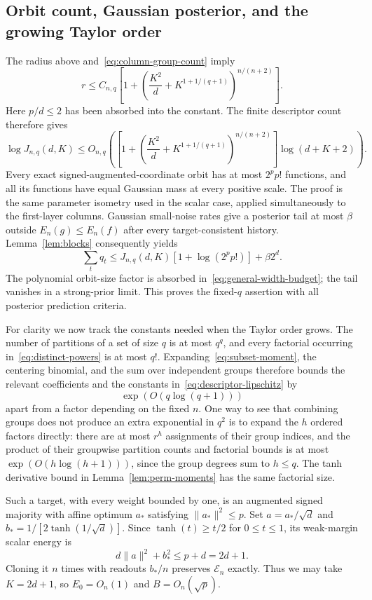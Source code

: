 \subsection{Orbit count, Gaussian posterior, and the growing Taylor order}
The radius above and~\eqref{eq:column-group-count} imply
\[
 r\le C_{n,q}\left[1+
 \left(\frac{K^2}{d}+K^{1+1/(q+1)}\right)^{n/(n+2)}\right].
\]
Here $p/d\le2$ has been absorbed into the constant. The finite descriptor count therefore gives
\[
 \log J_{n,q}(d,K)
 \le O_{n,q}\left(
 \left[1+\left(\frac{K^2}{d}+K^{1+1/(q+1)}\right)^{n/(n+2)}\right]
 \log(d+K+2)\right).
\]
Every exact signed-augmented-coordinate orbit has at most $2^pp!$ functions, and all its functions have equal Gaussian mass at every positive scale. The proof is the same parameter isometry used in the scalar case, applied simultaneously to the first-layer columns. Gaussian small-noise rates give a posterior tail at most $\beta$ outside $E_n(g)\le E_n(f)$ after every target-consistent history. Lemma~\ref{lem:blocks} consequently yields
\[
 \sum_tq_t\le J_{n,q}(d,K)[1+\log(2^pp!)]+\beta2^d.
\]
The polynomial orbit-size factor is absorbed in~\eqref{eq:general-width-budget}; the tail vanishes in a strong-prior limit. This proves the fixed-$q$ assertion with all posterior prediction criteria.

For clarity we now track the constants needed when the Taylor order grows. The number of partitions of a set of size $q$ is at most $q^q$, and every factorial occurring in~\eqref{eq:distinct-powers} is at most $q!$. Expanding~\eqref{eq:subset-moment}, the centering binomial, and the sum over independent groups therefore bounds the relevant coefficients and the constants in~\eqref{eq:descriptor-lipschitz} by
\[
 \exp(O(q\log(q+1)))
\]
apart from a factor depending on the fixed $n$. One way to see that combining groups does not produce an extra exponential in $q^2$ is to expand the $h$ ordered factors directly: there are at most $r^h$ assignments of their group indices, and the product of their groupwise partition counts and factorial bounds is at most $\exp(O(h\log(h+1)))$, since the group degrees sum to $h\le q$. The tanh derivative bound in Lemma~\ref{lem:perm-moments} has the same factorial size.

Such a target, with every weight bounded by one, is an augmented signed majority with affine optimum $a_*$ satisfying $\|a_*\|^2\le p$. Set $a=a_*/\sqrt d$ and $b_*=1/[2\tanh(1/\sqrt d)]$. Since $\tanh(t)\ge t/2$ for $0\le t\le1$, its weak-margin scalar energy is
\[
 d\|a\|^2+b_*^2\le p+d=2d+1.
\]
Cloning it $n$ times with readouts $b_*/n$ preserves $\mathcal E_n$ exactly. Thus we may take $K=2d+1$, so $E_0=O_n(1)$ and $B=O_n(\sqrt p)$.

